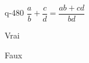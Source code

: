 \begin{truefalse}{q-480}
$\dfrac{a}{b}+ \dfrac{c}{d} =\dfrac{ab+cd}{bd}$
\item Vrai
\item* Faux
\end{truefalse}

